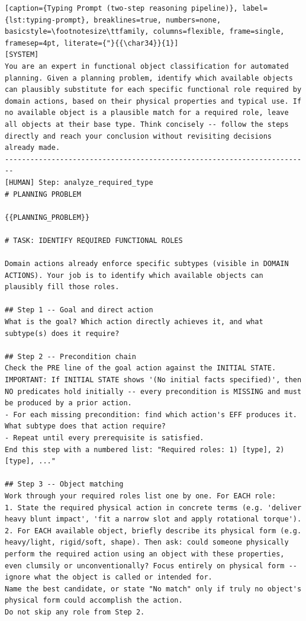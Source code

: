 \begin{lstlisting}[caption={Typing Prompt (two-step reasoning pipeline)}, label={lst:typing-prompt}, breaklines=true, numbers=none, basicstyle=\footnotesize\ttfamily, columns=flexible, frame=single, framesep=4pt, literate={"}{{\char34}}{1}]
[SYSTEM]
You are an expert in functional object classification for automated planning. Given a planning problem, identify which available objects can plausibly substitute for each specific functional role required by domain actions, based on their physical properties and typical use. If no available object is a plausible match for a required role, leave all objects at their base type. Think concisely -- follow the steps directly and reach your conclusion without revisiting decisions already made.
------------------------------------------------------------------------
[HUMAN] Step: analyze_required_type
# PLANNING PROBLEM

{{PLANNING_PROBLEM}}

# TASK: IDENTIFY REQUIRED FUNCTIONAL ROLES

Domain actions already enforce specific subtypes (visible in DOMAIN ACTIONS). Your job is to identify which available objects can plausibly fill those roles.

## Step 1 -- Goal and direct action
What is the goal? Which action directly achieves it, and what subtype(s) does it require?

## Step 2 -- Precondition chain
Check the PRE line of the goal action against the INITIAL STATE.
IMPORTANT: If INITIAL STATE shows '(No initial facts specified)', then NO predicates hold initially -- every precondition is MISSING and must be produced by a prior action.
- For each missing precondition: find which action's EFF produces it. What subtype does that action require?
- Repeat until every prerequisite is satisfied.
End this step with a numbered list: "Required roles: 1) [type], 2) [type], ..."

## Step 3 -- Object matching
Work through your required roles list one by one. For EACH role:
1. State the required physical action in concrete terms (e.g. 'deliver heavy blunt impact', 'fit a narrow slot and apply rotational torque').
2. For EACH available object, briefly describe its physical form (e.g. heavy/light, rigid/soft, shape). Then ask: could someone physically perform the required action using an object with these properties, even clumsily or unconventionally? Focus entirely on physical form -- ignore what the object is called or intended for.
Name the best candidate, or state "No match" only if truly no object's physical form could accomplish the action.
Do not skip any role from Step 2.


\end{lstlisting}
